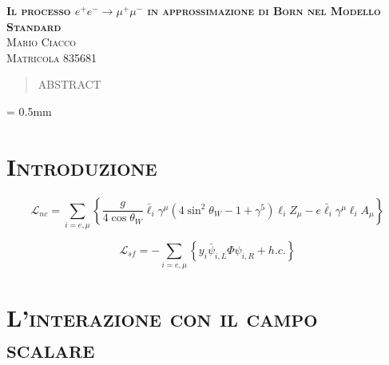 \documentclass[11pt]{article}
\begin{document}
\renewcommand{\abstractname}{\vspace{-\baselineskip}}

    
    \begin{center} %
        \LARGE{\textbf{\textsc{Il processo $e^+ e^- \to \mu ^+ \mu ^-$ in approssimazione di Born nel Modello Standard}}}
        \bigskip\\\large{\textsc{Mario Ciacco}}
        \\\large{\textsc{Matricola 835681}}
    \end{center}
    \normalsize


    \begin{abstract}
    ABSTRACT
    \end{abstract}

    \unitlength = 0.5mm %
    

    \section{\centering\textsc{Introduzione} } %

    \begin{equation}
    \mathcal{L}_{nc}=\sum_{i=e,\mu}\left\{\frac{g}{4\cos\theta_W}\bar{\ell}_i\gamma^\mu(4\sin^2\theta_W-1+\gamma^5)\ell_iZ_\mu-e\bar{\ell}_i\gamma^\mu\ell_iA_\mu\right\}
    \end{equation}

    \begin{equation}
    \mathcal{L}_{sf}=-\sum_{i=e,\mu}\left\{y_i\bar{\psi}_{i,L}\Phi\psi_{i,R}+h.c.\right\}
    \end{equation}



    \section{\centering\textsc{L'interazione con il campo scalare} }
\end{document}
